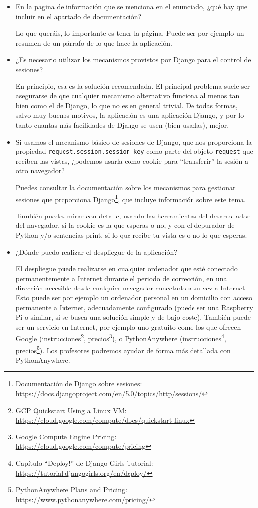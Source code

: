 \begin{itemize}
\item En la pagina de información que se menciona en el enunciado, ¿qué hay que incluir en el apartado de documentación?

Lo que queráis, lo importante es tener la página. Puede ser por ejemplo un resumen de un párrafo de lo que hace la aplicación.
  
\item ¿Es necesario utilizar los mecanismos provistos por Django para el control de sesiones?

  En principio, esa es la solución recomendada. El principal problema suele ser asegurarse de que cualquier mecanismo alternativo funciona al menos tan bien como el de Django, lo que no es en general trivial. De todas formas, salvo muy buenos motivos, la aplicación es una aplicación Django, y por lo tanto cuantas más facilidades de Django se usen (bien usadas), mejor.

\item Si usamos el mecanismo básico de sesiones de Django, que nos proporciona la propiedad \texttt{request.session.session\_key} como parte del objeto \texttt{request} que reciben las vistas, ¿podemos usarla como cookie para ``transferir'' la sesión a otro navegador?

  Puedes consultar la documentación sobre los mecanismos para gestionar sesiones que proporciona Django\footnote{Documentación de Django sobre sesiones:\\
    \url{https://docs.djangoproject.com/en/5.0/topics/http/sessions/}}, que incluye información sobre este tema.

  También puedes mirar con detalle, usando las herramientas del desarrollador del navegador, si la cookie es la que esperas o no, y con el depurador de Python y/o sentencias print, si lo que recibe tu vista es o no lo que esperas.

\item ¿Dónde puedo realizar el despliegue de la aplicación?

  El despliegue puede realizarse en cualquier ordenador que esté conectado permanentemente a Internet durante el periodo de corrección, en una dirección accesible desde cualquier navegador conectado a su vez a Internet. Esto puede ser por ejemplo un ordenador personal en un domicilio con acceso permanente a Internet, adecuadamente configurado (puede ser una Raspberry Pi o similar, si se busca una solución simple y de bajo coste). También puede ser un servicio en Internet, por ejemplo uno gratuito como los que ofrecen Google (instrucciones\footnote{GCP Quickstart Using a Linux VM:\\ \url{https://cloud.google.com/compute/docs/quickstart-linux}}, precios\footnote{Google Compute Engine Pricing:\\ \url{https://cloud.google.com/compute/pricing}}), o PythonAnywhere (instrucciones\footnote{Capítulo ``Deploy!'' de Django Girls Tutorial:\\ \url{https://tutorial.djangogirls.org/en/deploy/}}, precios\footnote{PythonAnywhere Plans and Pricing:\\ \url{https://www.pythonanywhere.com/pricing/}}). Los profesores podremos ayudar de forma más detallada con PythonAnywhere.


\end{itemize}
